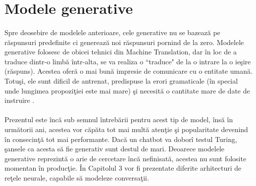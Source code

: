 \section{Modele generative}

\paragraph{}
Spre deosebire de modelele anterioare, cele generative nu se bazeaz\u a pe r\u aspunsuri predefinite ci genereaz\u a noi r\u aspunsuri pornind de la zero. Modelele generative folosesc de obicei tehnici din Machine Translation, dar \^ in loc de a traduce dintr-o limb\u a \^ intr-alta, se va realiza o ``traduce" de la o intrare la o ie\c sire (r\u aspuns). Acestea ofer\u a o mai bun\u a impresie de comunicare cu o entitate uman\u a. Totu\c si, ele sunt dificil de antrenat, predispuse la erori gramaticale (\^ in special unde lungimea propozi\c tiei este mai mare) \c si necesit\u a o cantitate mare de date de instruire \cite{wildml-chatbots}.

\paragraph{}
Prezentul este \^ inc\u a sub semnul \^ intreb\u arii pentru acest tip de model, \^ ins\u a \^ in urm\u atorii ani, acestea vor c\u ap\u ata tot mai mult\u a aten\c tie \c si popularitate devenind \^ in consecin\c t\u a tot mai performante. Dac\u a un chatbot va dobor\^ i testul Turing, \c sansele ca acesta s\u a fie generativ sunt destul de mari. Deoarece modelele generative reprezint\u a o arie de cercetare \^ inc\u a nefinisat\u a, acestea nu sunt folosite momentan \^ in produc\c tie. \^ In Capitolul 3 vor fi prezentate diferite arhitecturi de re\c tele neurale, capabile s\u a modeleze conversa\c tii.